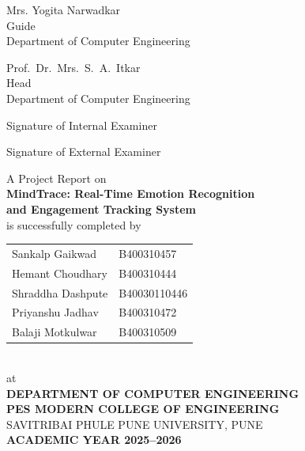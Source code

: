 \vspace{1.2cm}

\noindent
\begin{minipage}[t]{0.45\textwidth}
  \centering
  Mrs. Yogita Narwadkar\\[2pt]
  Guide\\[2pt]
  Department of Computer Engineering
\end{minipage}%
\hfill
\begin{minipage}[t]{0.45\textwidth}
  \centering
  Prof.\ Dr.\ Mrs.\ S.\ A.\ Itkar\\[2pt]
  Head\\[2pt]
  Department of Computer Engineering
\end{minipage}

\vspace{2cm}

\noindent
\begin{minipage}[t]{0.45\textwidth}
  \centering
  Signature of Internal Examiner
\end{minipage}%
\hfill
\begin{minipage}[t]{0.45\textwidth}
  \centering
  Signature of External Examiner
\end{minipage}

\newpage
\thispagestyle{plain}

\vspace*{1cm}

\begin{center}
{\normalsize A Project Report on}\\[8pt]
{\large \textbf{MindTrace: Real-Time Emotion Recognition\\
and Engagement Tracking System}}\\[10pt]
{\normalsize is successfully completed by}\\[10pt]
\begin{tabular}{ll}
  Sankalp Gaikwad & B400310457 \\[4pt]
  Hemant Choudhary & B400310444 \\[4pt]
  Shraddha Dashpute & B40030110446 \\[4pt]
  Priyanshu Jadhav & B400310472 \\[4pt]
  Balaji Motkulwar & B400310509 \\[4pt]
\end{tabular}\\[14pt]
{\normalsize at}\\[10pt]
{\large \textbf{DEPARTMENT OF COMPUTER ENGINEERING}}\\[4pt]
{\large \textbf{PES MODERN COLLEGE OF ENGINEERING}}\\[4pt]
{\normalsize SAVITRIBAI PHULE PUNE UNIVERSITY, PUNE}\\[4pt]
{\normalsize \textbf{ACADEMIC YEAR 2025--2026}}
\end{center}

